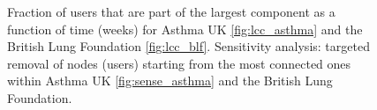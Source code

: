 \begin{figure}[!ht]
    \centering


    \caption{Fraction of users that are part of the largest component as a function of time (weeks) for Asthma UK \ref{fig:lcc_asthma} and the British Lung Foundation \ref{fig:lcc_blf}. Sensitivity analysis: targeted removal of nodes (users) starting from the most connected ones within Asthma UK \ref{fig:sense_asthma} and the British Lung Foundation. }
\end{figure}


